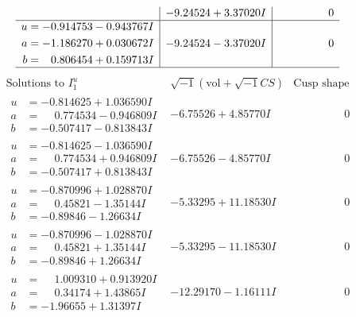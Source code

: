 \documentclass[1p]{elsarticle_modified}
\theoremstyle{definition}
\newcommand{\I}{\sqrt{-1}}
\begin{document}
$$\begin{array}{c|c|c}
 & -9.24524 + 3.37020 I & \phantom{-0.000000 } 0 \\ \hline\begin{aligned}
u &= -0.914753 - 0.943767 I \\
a &= -1.186270 + 0.030672 I \\
b &= \phantom{-}0.806454 + 0.159713 I\end{aligned}
 & -9.24524 - 3.37020 I & \phantom{-0.000000 } 0\\
 \hline 
 \end{array}$$\newpage$$\begin{array}{c|c|c}  
\text{Solutions to }I^u_{1}& \I (\text{vol} + \sqrt{-1}CS) & \text{Cusp shape}\\
 \hline 
\begin{aligned}
u &= -0.814625 + 1.036590 I \\
a &= \phantom{-}0.774534 - 0.946809 I \\
b &= -0.507417 - 0.813843 I\end{aligned}
 & -6.75526 + 4.85770 I & \phantom{-0.000000 } 0 \\ \hline\begin{aligned}
u &= -0.814625 - 1.036590 I \\
a &= \phantom{-}0.774534 + 0.946809 I \\
b &= -0.507417 + 0.813843 I\end{aligned}
 & -6.75526 - 4.85770 I & \phantom{-0.000000 } 0 \\ \hline\begin{aligned}
u &= -0.870996 + 1.028870 I \\
a &= \phantom{-}0.45821 - 1.35144 I \\
b &= -0.89846 - 1.26634 I\end{aligned}
 & -5.33295 + 11.18530 I & \phantom{-0.000000 } 0 \\ \hline\begin{aligned}
u &= -0.870996 - 1.028870 I \\
a &= \phantom{-}0.45821 + 1.35144 I \\
b &= -0.89846 + 1.26634 I\end{aligned}
 & -5.33295 - 11.18530 I & \phantom{-0.000000 } 0 \\ \hline\begin{aligned}
u &= \phantom{-}1.009310 + 0.913920 I \\
a &= \phantom{-}0.34174 + 1.43865 I \\
b &= -1.96655 + 1.31397 I\end{aligned}
 & -12.29170 - 1.16111 I & \phantom{-0.000000 } 0 \\ \hline\begin{aligned}

\end{aligned}
\end{array}$$
\end{document}
